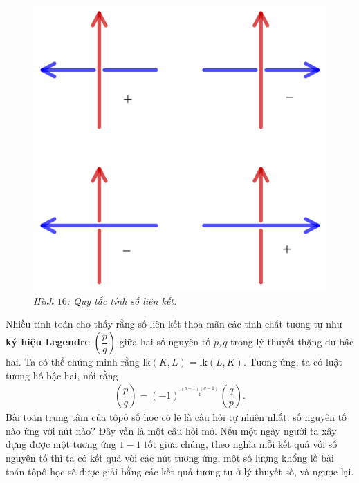 \begin{multicols}{2}
\begin{figure}[H]
		\includegraphics[width= 0.75\linewidth]{h16}
		\caption{\small\textit{\color{duongvaotoanhoc}Hình $16$: Quy tắc tính số liên kết.}}
		\vspace*{-10pt}
	\end{figure}
	Nhiều tính toán cho thấy rằng số liên kết thỏa mãn các tính chất tương tự như {\bf\color{duongvaotoanhoc} ký hiệu Legendre} $\left(\dfrac{p}{q}\right)$ giữa hai số nguyên tố $p, q$ trong lý thuyết thặng dư bậc hai. Ta có thể chứng minh rằng $\text{lk}(K,L) = \text{lk}(L,K)$. Tương ứng, ta có luật tương hỗ bậc hai, nói rằng 
	\begin{align*}
		\left(\dfrac{p}{q}\right) = (-1)^{\tfrac{(p-1)(q-1)}{4}}\left(\dfrac{q}{p}\right).
	\end{align*}
	Bài toán trung tâm của tôpô số học có lẽ là câu hỏi tự nhiên nhất: số nguyên tố nào ứng với nút nào? Đây vẫn là một câu hỏi mở. Nếu một ngày người ta xây dựng được một tương ứng $1-1$ tốt giữa chúng, theo nghĩa mỗi kết quả với số nguyên tố thì ta có kết quả với các nút tương ứng, một số lượng khổng lồ bài toán tôpô học sẽ được giải bằng các kết quả tương tự ở lý thuyết số, và ngược lại.
%	
\end{multicols}